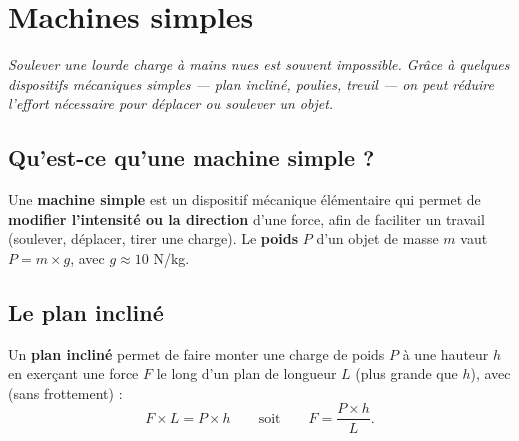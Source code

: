 \chapter{Machines simples}

\noindent\textit{Soulever une lourde charge à mains nues est souvent impossible. Grâce à
quelques dispositifs mécaniques simples — plan incliné, poulies, treuil — on peut réduire
l'effort nécessaire pour déplacer ou soulever un objet.}
\vspace{8pt}

\connecteBanner

\section{Qu'est-ce qu'une machine simple ?}

\begin{definition}
Une \textbf{machine simple} est un dispositif mécanique élémentaire qui permet de
\textbf{modifier l'intensité ou la direction} d'une force, afin de faciliter un travail
(soulever, déplacer, tirer une charge). Le \textbf{poids} $P$ d'un objet de masse $m$ vaut
$P=m\times g$, avec $g\approx10$ N/kg.
\end{definition}

\section{Le plan incliné}

\begin{propriete}
Un \textbf{plan incliné} permet de faire monter une charge de poids $P$ à une hauteur $h$
en exerçant une force $F$ le long d'un plan de longueur $L$ (plus grande que $h$), avec
(sans frottement) :
\[
F\times L=P\times h \qquad\text{soit}\qquad F=\frac{P\times h}{L}.
\]
\end{propriete}

\begin{illus}
\end{illus}


